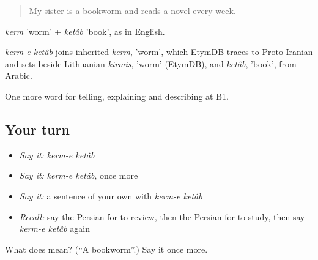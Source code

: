 \begin{quote}
My sister is a bookworm and reads a novel every week.
\end{quote}

\emph{kerm} 'worm' + \emph{ketâb} 'book', as in English.

\begin{cousinweb}
\emph{kerm-e ketâb} joins inherited \emph{kerm}, 'worm', which EtymDB traces to Proto-Iranian and sets beside Lithuanian \emph{kirmis}, 'worm' (EtymDB), and \emph{ketâb}, 'book', from Arabic.
\end{cousinweb}

\begin{grammarlens}[title={What you've built}]
One more word for telling, explaining and describing at B1.
\end{grammarlens}

\subsection*{Your turn}
\begin{itemize}
\raggedright
  \item \emph{Say it:} \emph{kerm-e ketâb}
  \item \emph{Say it:} \emph{kerm-e ketâb}, once more
  \item \emph{Say it:} a sentence of your own with \emph{kerm-e ketâb}
  \item \emph{Recall:} say the Persian for to review, then the Persian for to study, then say \emph{kerm-e ketâb} again
\end{itemize}

\begin{tcolorbox}[breakable,colback=teal!4,colframe=teal!35!black,title={Before you move on}]
What does   mean? (\textquotedblleft{}A bookworm\textquotedblright{}.) Say it once more.
\end{tcolorbox}
